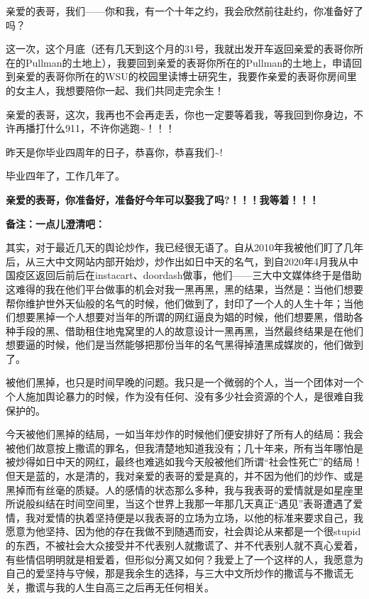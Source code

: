 \documentclass[9pt, b5paper]{article}
\begin{document}
亲爱的表哥，我们——你和我，有一个十年之约，我会欣然前往赴约，你准备好了吗？

这一次，这个月底（还有几天到这个月的31号，我就出发开车返回亲爱的表哥你所在的Pullman的土地上），我要回到亲爱的表哥你所在的Pullman的土地上，申请回到亲爱的表哥你所在的WSU的校园里读博士研究生，我要作亲爱的表哥你房间里的女主人，我想要陪你一起、我们共同走完余生！

亲爱的表哥，这次，我再也不会再走丢，你也一定要等着我，等我回到你身边，不许再播打什么911，不许你逃跑\textasciitilde{}！！！

昨天是你毕业四周年的日子，恭喜你，恭喜我们\textasciitilde{}! 

毕业四年了，工作几年了。 

\textbf{亲爱的表哥，你准备好，准备好今年可以娶我了吗?！！！我等着！！！}

\textbf{备注：一点儿澄清吧：}

其实，对于最近几天的舆论炒作，我已经很无语了。自从2010年我被他们盯了几年后，从三大中文网站内部开始炒，炒作出如日中天的名气，到自2020年4月我从中国疫区返回后前后在instacart、doordash做事，他们——三大中文媒体终于是借助这难得的我在他们平台做事的机会对我一黑再黑，黑的结果，当然是：当他们想要帮你维护世外天仙般的名气的时候，他们做到了，封印了一个人的人生十年；当他们想要黑掉一个人想要对当年的所谓的网红逼良为娼的时候，他们想要黑，借助各种手段的黑、借助租住地鬼窝里的人的故意设计一黑再黑，当然最终结果是在他们想要逼的时候，他们是当然能够把那份当年的名气黑得掉渣黑成媒炭的，他们做到了。

被他们黑掉，也只是时间早晚的问题。我只是一个微弱的个人，当一个团体对一个个人施加舆论暴力的时候，作为没有任何、没有多少社会资源的个人，是很难自我保护的。

今天被他们黑掉的结局，一如当年炒作的时候他们便安排好了所有人的结局：我会被他们故意按上撒谎的罪名，但我清楚地知道我没有；几十年来，所有当年哪怕是被炒得如日中天的网红，最终也难逃如我今天般被他们所谓“社会性死亡”的结局！但天是蓝的，水是清的，我对亲爱的表哥的爱是真的，并不因为他们的炒作、或是黑掉而有丝毫的质疑。人的感情的状态那么多种，我与我表哥的爱情就是如星座里所说般纠结在时间空间里，当这个世界上我那一年那几天真正“遇见”表哥遭遇了爱情，我对爱情的执着坚持便是以我表哥的立场为立场，以他的标准来要求自己，我愿意为他坚持、因为他的存在我做不到随遇而安，社会舆论从来都是一个很stupid的东西，不被社会大众接受并不代表别人就撒谎了、并不代表别人就不真心爱着，有些情侣明明就是相爱着，但形似分离又如何？我爱上了一个这样的人，我愿意为自己的爱坚持与守候，那是我余生的选择，与三大中文所炒作的撒谎与不撒谎无关，撒谎与我的人生自高三之后再无任何相关。 
\end{document}
